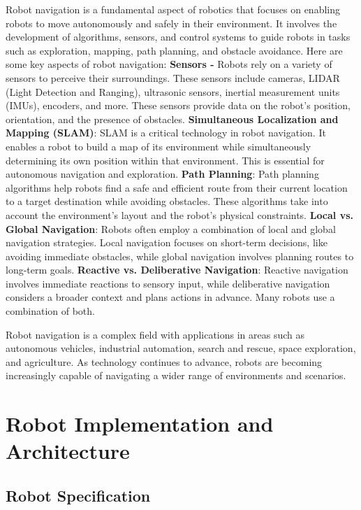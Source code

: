 \documentclass[conference]{IEEEtran}
\begin{document}
Robot navigation is a fundamental aspect of robotics that focuses on enabling robots to move autonomously and safely in their environment. It involves the development of algorithms, sensors, and control systems to guide robots in tasks such as exploration, mapping, path planning, and obstacle avoidance. Here are some key aspects of robot navigation: \textbf{Sensors -} Robots rely on a variety of sensors to perceive their surroundings. These sensors include cameras, LIDAR (Light Detection and Ranging), ultrasonic sensors, inertial measurement units (IMUs), encoders, and more. These sensors provide data on the robot's position, orientation, and the presence of obstacles. \textbf{Simultaneous Localization and Mapping (SLAM)}: SLAM is a critical technology in robot navigation. It enables a robot to build a map of its environment while simultaneously determining its own position within that environment. This is essential for autonomous navigation and exploration.\textbf{ Path Planning}: Path planning algorithms help robots find a safe and efficient route from their current location to a target destination while avoiding obstacles. These algorithms take into account the environment's layout and the robot's physical constraints. \textbf{Local vs. Global Navigation}: Robots often employ a combination of local and global navigation strategies. Local navigation focuses on short-term decisions, like avoiding immediate obstacles, while global navigation involves planning routes to long-term goals. \textbf{Reactive vs. Deliberative Navigation}: Reactive navigation involves immediate reactions to sensory input, while deliberative navigation considers a broader context and plans actions in advance. Many robots use a combination of both. \par
Robot navigation is a complex field with applications in areas such as autonomous vehicles, industrial automation, search and rescue, space exploration, and agriculture. As technology continues to advance, robots are becoming increasingly capable of navigating a wider range of environments and scenarios.


\section{Robot Implementation and Architecture}

\subsection{Robot Specification}
\end{document}
